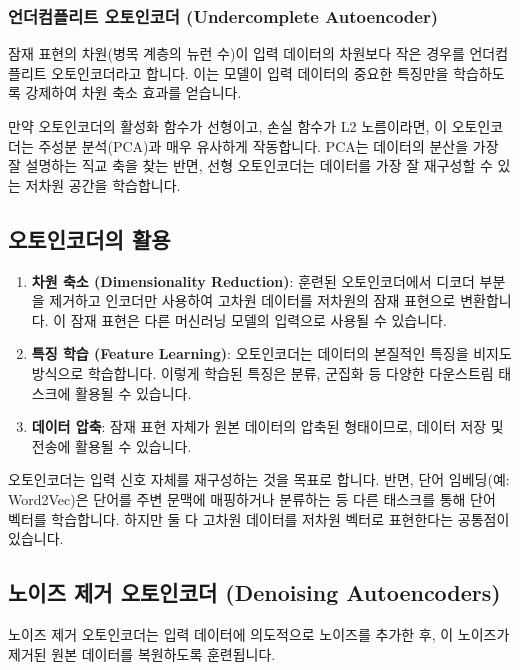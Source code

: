 \documentclass[11pt,a4paper]{article}
\begin{document}
\subsubsection{언더컴플리트 오토인코더 (Undercomplete Autoencoder)}
잠재 표현의 차원(병목 계층의 뉴런 수)이 입력 데이터의 차원보다 작은 경우를 언더컴플리트 오토인코더라고 합니다. 이는 모델이 입력 데이터의 중요한 특징만을 학습하도록 강제하여 차원 축소 효과를 얻습니다.

\begin{tipbox}
만약 오토인코더의 활성화 함수가 선형이고, 손실 함수가 L2 노름이라면, 이 오토인코더는 주성분 분석(PCA)과 매우 유사하게 작동합니다. PCA는 데이터의 분산을 가장 잘 설명하는 직교 축을 찾는 반면, 선형 오토인코더는 데이터를 가장 잘 재구성할 수 있는 저차원 공간을 학습합니다.
\end{tipbox}

\subsection{오토인코더의 활용}
\begin{enumerate}
    \item \textbf{차원 축소 (Dimensionality Reduction)}: 훈련된 오토인코더에서 디코더 부분을 제거하고 인코더만 사용하여 고차원 데이터를 저차원의 잠재 표현으로 변환합니다. 이 잠재 표현은 다른 머신러닝 모델의 입력으로 사용될 수 있습니다.
    \item \textbf{특징 학습 (Feature Learning)}: 오토인코더는 데이터의 본질적인 특징을 비지도 방식으로 학습합니다. 이렇게 학습된 특징은 분류, 군집화 등 다양한 다운스트림 태스크에 활용될 수 있습니다.
    \item \textbf{데이터 압축}: 잠재 표현 자체가 원본 데이터의 압축된 형태이므로, 데이터 저장 및 전송에 활용될 수 있습니다.
\end{enumerate}

\begin{tcolorbox}[title=\textbf{임베딩과의 비교}]
오토인코더는 입력 신호 자체를 재구성하는 것을 목표로 합니다. 반면, 단어 임베딩(예: Word2Vec)은 단어를 주변 문맥에 매핑하거나 분류하는 등 다른 태스크를 통해 단어 벡터를 학습합니다. 하지만 둘 다 고차원 데이터를 저차원 벡터로 표현한다는 공통점이 있습니다.
\end{tcolorbox}

\subsection{노이즈 제거 오토인코더 (Denoising Autoencoders)}
노이즈 제거 오토인코더는 입력 데이터에 의도적으로 노이즈를 추가한 후, 이 노이즈가 제거된 원본 데이터를 복원하도록 훈련됩니다.
\end{document}
